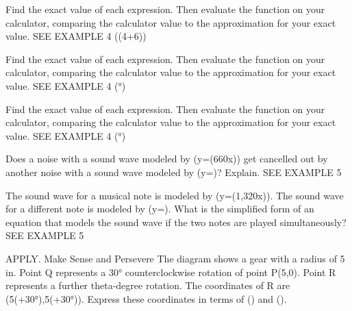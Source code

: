 \documentclass{article}
\newenvironment{practice}[2]{}{}        %
\newcommand{\answer}[1]{}               %
\newcommand{\placeholder}[2]{}          %
\begin{document}
\begin{practice}{28}{1}
Find the exact value of each expression. Then evaluate the function on your calculator, comparing the calculator value to the approximation for your exact value. SEE EXAMPLE 4
(\sin(\frac{3\pi}4+\frac{5\pi}6))
\answer{(\frac{-\sqrt6-\sqrt2}{4}); -0.966}
\end{practice}
\begin{practice}{29}{1}
Find the exact value of each expression. Then evaluate the function on your calculator, comparing the calculator value to the approximation for your exact value. SEE EXAMPLE 4
(°)
\answer{(\frac{-\sqrt2}{2}); -0.707}
\end{practice}
\begin{practice}{30}{1}
Find the exact value of each expression. Then evaluate the function on your calculator, comparing the calculator value to the approximation for your exact value. SEE EXAMPLE 4
(°)
\answer{(\frac{\sqrt2+\sqrt6}{4}); 0.966}
\end{practice}
\begin{practice}{31}{2}
Does a noise with a sound wave modeled by (y=\sin(660\pi x)) get cancelled out by another noise with a sound wave modeled by (y=\sin[660\pi(x-\frac1{220})])? Explain. SEE EXAMPLE 5
\answer{Yes; since the sum of the sound waves is 0 for all values of x, the noises cancel one another.}
\end{practice}
\begin{practice}{32}{2}
The sound wave for a musical note is modeled by (y=\sin(1,320\pi x)). The sound wave for a different note is modeled by (y=\sin[1,320\pi(x+\frac1{220})]). What is the simplified form of an equation that models the sound wave if the two notes are played simultaneously? SEE EXAMPLE 5
\answer{(y=2\sin(1,320\pi x))}
\end{practice}
\begin{practice}{33}{2}
APPLY. Make Sense and Persevere The diagram shows a gear with a radius of 5 in. Point Q represents a 30° counterclockwise rotation of point P(5,0). Point R represents a further theta-degree rotation. The coordinates of R are (5\cos(\theta+30°),5\sin(\theta+30°)). Express these coordinates in terms of (\cos\theta) and (\sin\theta).
\placeholder{graph}{Photo of gears overlaid with coordinate grid, unit spacing, window x[-7,7] and y[-6,6], black double-arrowed x,y axes, O origin. Labels x=-6,-4,-2,2,4,6, y=-4,-2,2,4. Black circle radius 5 centered O, filled P(5,0) on positive x axis, Q in quadrant I at 30°, R quadrant II approximately (-3.5,3.5). Red radii OQ,OR; red 30° arc from positive x axis to Q and theta arc from Q to R.}
\answer{(\frac{5\sqrt3}{2}\cos\theta-\frac52\sin\theta,\frac{5\sqrt3}{2}\sin\theta+\frac52\cos\theta)}
\end{practice}
\end{document}
